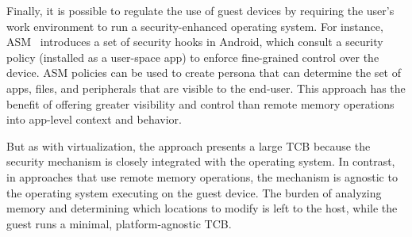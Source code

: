 Finally, it is possible to regulate the use of guest devices by requiring the
user's work environment to run a security-enhanced operating system. For
instance, ASM~\cite{asm:sec14} introduces a set of security hooks in Android,
which consult a security policy (installed as a user-space app) to enforce
fine-grained control over the device. ASM policies can be used to create
persona that can determine the set of apps, files, and peripherals that are
visible to the end-user. This approach has the benefit of offering greater
visibility and control than remote memory operations into app-level context and
behavior.

But as with virtualization, the approach presents a large TCB because the
security mechanism is closely integrated with the operating system. In
contrast, in approaches that use remote memory operations, the mechanism is
agnostic to the operating system executing on the guest device. The burden of
analyzing memory and determining which locations to modify is left to the host,
while the guest runs a minimal, platform-agnostic TCB.




